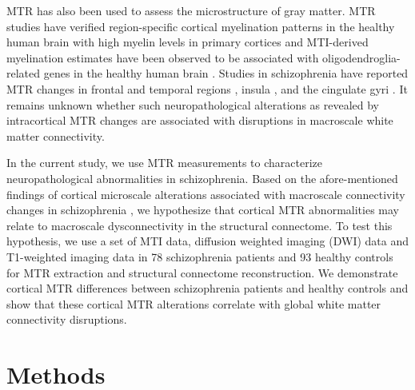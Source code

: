 \begin{refsection}
MTR has also been used to assess the microstructure of gray matter. MTR studies have verified region-specific cortical myelination patterns in the healthy human brain \citep{Whitaker2016AdolescenceIA} with high myelin levels in primary cortices \citep{Glasser2014TrendsAP,Shafee2015GrayMM} and MTI-derived myelination estimates have been observed to be associated with oligodendroglia-related genes in the healthy human brain \citep{Whitaker2016AdolescenceIA}. Studies in schizophrenia have reported MTR changes in frontal and temporal regions \citep{Bagary2003GrayAW,Foong2001NeuropathologicalAI,Price2010BrainPI}, insula \citep{Bagary2003GrayAW}, and the cingulate gyri \citep{Price2010BrainPI}. It remains unknown whether such neuropathological alterations as revealed by intracortical MTR changes are associated with disruptions in macroscale white matter connectivity.

In the current study, we use MTR measurements to characterize neuropathological abnormalities in schizophrenia. Based on the afore-mentioned findings of cortical microscale alterations associated with macroscale connectivity changes in schizophrenia \citep{VANDENHEUVEL2016293}, we hypothesize that cortical MTR abnormalities may relate to macroscale dysconnectivity in the structural connectome. To test this hypothesis, we use a set of MTI data, diffusion weighted imaging (DWI) data and T1-weighted imaging data in 78 schizophrenia patients and 93 healthy controls for MTR extraction and structural connectome reconstruction. We demonstrate cortical MTR differences between schizophrenia patients and healthy controls and show that these cortical MTR alterations correlate with global white matter connectivity disruptions.

\section*{Methods}

\end{refsection}
